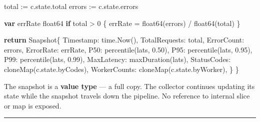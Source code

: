 \documentclass[
]{article}
\newenvironment{Shaded}{}{}
\newcommand{\ControlFlowTok}[1]{\textcolor[rgb]{0.00,0.44,0.13}{\textbf{#1}}}
\newcommand{\DataTypeTok}[1]{\textcolor[rgb]{0.56,0.13,0.00}{#1}}
\newcommand{\DecValTok}[1]{\textcolor[rgb]{0.25,0.63,0.44}{#1}}
\newcommand{\FloatTok}[1]{\textcolor[rgb]{0.25,0.63,0.44}{#1}}
\newcommand{\KeywordTok}[1]{\textcolor[rgb]{0.00,0.44,0.13}{\textbf{#1}}}
\newcommand{\NormalTok}[1]{#1}
\newcommand{\OperatorTok}[1]{\textcolor[rgb]{0.40,0.40,0.40}{#1}}
\begin{document}
\begin{Shaded}
\begin{Highlighting}[]
\NormalTok{    total }\OperatorTok{:=}\NormalTok{ c}\OperatorTok{.}\NormalTok{state}\OperatorTok{.}\NormalTok{total}
\NormalTok{    errors }\OperatorTok{:=}\NormalTok{ c}\OperatorTok{.}\NormalTok{state}\OperatorTok{.}\NormalTok{errors}

    \KeywordTok{var}\NormalTok{ errRate }\DataTypeTok{float64}
    \ControlFlowTok{if}\NormalTok{ total }\OperatorTok{\textgreater{}} \DecValTok{0} \OperatorTok{\{}
\NormalTok{        errRate }\OperatorTok{=} \DataTypeTok{float64}\OperatorTok{(}\NormalTok{errors}\OperatorTok{)} \OperatorTok{/} \DataTypeTok{float64}\OperatorTok{(}\NormalTok{total}\OperatorTok{)}
    \OperatorTok{\}}

    \ControlFlowTok{return}\NormalTok{ Snapshot}\OperatorTok{\{}
\NormalTok{        Timestamp}\OperatorTok{:}\NormalTok{      time}\OperatorTok{.}\NormalTok{Now}\OperatorTok{(),}
\NormalTok{        TotalRequests}\OperatorTok{:}\NormalTok{  total}\OperatorTok{,}
\NormalTok{        ErrorCount}\OperatorTok{:}\NormalTok{     errors}\OperatorTok{,}
\NormalTok{        ErrorRate}\OperatorTok{:}\NormalTok{      errRate}\OperatorTok{,}
\NormalTok{        P50}\OperatorTok{:}\NormalTok{            percentile}\OperatorTok{(}\NormalTok{lats}\OperatorTok{,} \DecValTok{0}\FloatTok{.50}\OperatorTok{),}
\NormalTok{        P95}\OperatorTok{:}\NormalTok{            percentile}\OperatorTok{(}\NormalTok{lats}\OperatorTok{,} \DecValTok{0}\FloatTok{.95}\OperatorTok{),}
\NormalTok{        P99}\OperatorTok{:}\NormalTok{            percentile}\OperatorTok{(}\NormalTok{lats}\OperatorTok{,} \DecValTok{0}\FloatTok{.99}\OperatorTok{),}
\NormalTok{        MaxLatency}\OperatorTok{:}\NormalTok{     maxDuration}\OperatorTok{(}\NormalTok{lats}\OperatorTok{),}
\NormalTok{        StatusCodes}\OperatorTok{:}\NormalTok{    cloneMap}\OperatorTok{(}\NormalTok{c}\OperatorTok{.}\NormalTok{state}\OperatorTok{.}\NormalTok{byCodes}\OperatorTok{),}
\NormalTok{        WorkerCounts}\OperatorTok{:}\NormalTok{   cloneMap}\OperatorTok{(}\NormalTok{c}\OperatorTok{.}\NormalTok{state}\OperatorTok{.}\NormalTok{byWorker}\OperatorTok{),}
    \OperatorTok{\}}
\OperatorTok{\}}
\end{Highlighting}
\end{Shaded}

The snapshot is a \textbf{value type} --- a full copy. The collector
continues updating its state while the snapshot travels down the
pipeline. No reference to internal slice or map is exposed.

\begin{center}\rule{0.5\linewidth}{0.5pt}\end{center}
\end{document}
